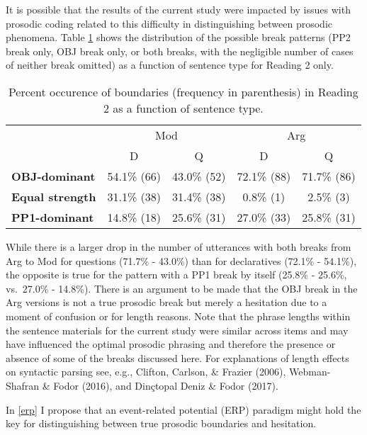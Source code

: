 \documentclass[11pt,oneside]{book}
\begin{document}
It is possible that the results of the current study were impacted by issues with prosodic coding related to this difficulty in distinguishing between prosodic phenomena. Table \ref{tab:combobr} shows the distribution of the possible break patterns (PP2 break only, OBJ break only, or both breaks, with the negligible number of cases of neither break omitted) as a function of sentence type for Reading 2 only.

\begin{table}[!h]

\caption{\label{tab:combobr}Percent occurence of boundaries (frequency in parenthesis) in Reading 2 as a function of sentence type.}
\centering
\begin{tabular}{>{\bfseries}lcccc}
\toprule
\multicolumn{1}{c}{ } & \multicolumn{2}{c}{Mod} & \multicolumn{2}{c}{Arg} \\
\cmidrule(l{3pt}r{3pt}){2-3} \cmidrule(l{3pt}r{3pt}){4-5}
  & D & Q & D & Q\\
\midrule
OBJ-dominant & 54.1\% (66) & 43.0\% (52) & 72.1\% (88) & 71.7\% (86)\\
Equal strength & 31.1\% (38) & 31.4\% (38) & 0.8\% (1) & 2.5\% (3)\\
PP1-dominant & 14.8\% (18) & 25.6\% (31) & 27.0\% (33) & 25.8\% (31)\\
\bottomrule
\end{tabular}
\end{table}

While there is a larger drop in the number of utterances with both breaks from Arg to Mod for questions (71.7\% - 43.0\%) than for declaratives (72.1\% - 54.1\%), the opposite is true for the pattern with a PP1 break by itself (25.8\% - 25.6\%, vs.~27.0\% - 14.8\%). There is an argument to be made that the OBJ break in the Arg versions is not a true prosodic break but merely a hesitation due to a moment of confusion or for length reasons. Note that the phrase lengths within the sentence materials for the current study were similar across items and may have influenced the optimal prosodic phrasing and therefore the presence or absence of some of the breaks discussed here. For explanations of length effects on syntactic parsing see, e.g., Clifton, Carlson, \& Frazier (2006), Webman-Shafran \& Fodor (2016), and Dinçtopal Deniz \& Fodor (2017).

In \ref{erp} I propose that an event-related potential (ERP) paradigm might hold the key for distinguishing between true prosodic boundaries and hesitation.
\end{document}
